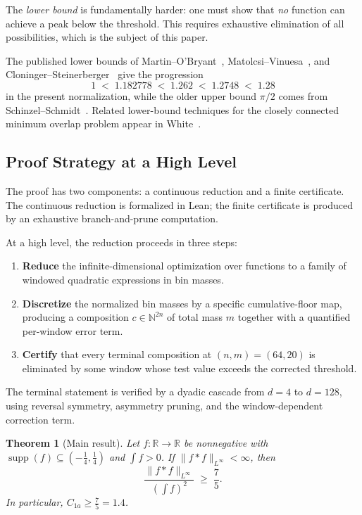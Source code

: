 \documentclass[11pt, letterpaper]{article}
\theoremstyle{paperplain}
\newtheorem{theorem}{Theorem}[section]
\theoremstyle{paperdef}
\newcommand{\R}{\mathbb{R}}
\newcommand{\supp}{\operatorname{supp}}
\begin{document}
The \emph{lower bound} is fundamentally harder: one must show that
\emph{no} function can achieve a peak below the threshold.  This
requires exhaustive elimination of all possibilities, which is the
subject of this paper.

The published lower bounds of Martin--O'Bryant~\cite{MO2004,MO2009},
Matolcsi--Vinuesa~\cite{MV10}, and
Cloninger--Steinerberger~\cite{CS17} give the progression
\[
  1 \;<\; 1.182778 \;<\; 1.262 \;<\; 1.2748 \;<\; 1.28
\]
in the present normalization, while the older upper bound $\pi/2$
comes from Schinzel--Schmidt~\cite{SS2002}.  Related lower-bound
techniques for the closely connected minimum overlap problem appear
in White~\cite{White22}.

\subsection{Proof Strategy at a High Level}

The proof has two components: a continuous reduction and a finite
certificate.  The continuous reduction is formalized in Lean; the
finite certificate is produced by an exhaustive branch-and-prune
computation.

At a high level, the reduction proceeds in three steps:

\begin{enumerate}[label=(\roman*)]
  \item \textbf{Reduce} the infinite-dimensional optimization
    over functions to a family of windowed quadratic expressions in bin
    masses.

  \item \textbf{Discretize} the normalized bin masses by a specific
    cumulative-floor map, producing a composition
    $c \in \mathbb{N}^{2n}$ of total mass $m$ together with a
    quantified per-window error term.

  \item \textbf{Certify} that every terminal composition at
    $(n,m)=(64,20)$ is eliminated by some window whose test value
    exceeds the corrected threshold.
\end{enumerate}

The terminal statement is verified by a dyadic cascade from $d=4$ to
$d=128$, using reversal symmetry, asymmetry pruning, and the
window-dependent correction term.

\begin{theorem}[Main result]
\label{thm:main}
Let $f : \R \to \R$ be nonnegative with
$\supp(f) \subseteq (-\tfrac14,\tfrac14)$ and $\int f > 0$.  If
$\|f*f\|_{L^\infty} < \infty$, then
\[
  \frac{\|f*f\|_{L^\infty}}{\left(\int f\right)^2} \;\ge\; \frac75.
\]
In particular, $C_{1a} \ge \tfrac75 = 1.4$.
\end{theorem}
\end{document}
